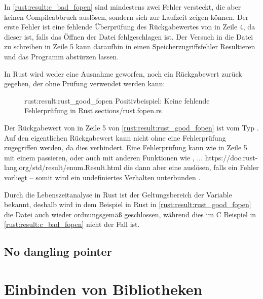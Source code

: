 In \autoref{rust:result:c_bad_fopen} sind mindestens zwei Fehler versteckt, die aber keinen Compileabbruch auslösen, sondern sich zur Laufzeit zeigen können.
Der erste Fehler ist eine fehlende Überprüfung des Rückgabewertes von  in Zeile 4, da dieser  ist, falls das Öffnen der Datei fehlgeschlagen ist.
Der Versuch in die Datei zu schreiben in Zeile 5 kann daraufhin in einen Speicherzugriffsfehler Resultieren und das Programm abstürzen lassen.

In Rust wird weder eine Ausnahme geworfen, noch ein Rückgabewert zurück gegeben, der ohne Prüfung verwendet werden kann:

\begin{figure}[H]
	\rustcinclude
		{rust:result:rust_good_fopen}
		{Positivbeispiel: Keine fehlende Fehlerprüfung in Rust}
		{sections/rust.fopen.rs}
\end{figure}

Der Rückgabewert von  in Zeile 5 von \autoref{rust:result:rust_good_fopen} ist vom Typ .
Auf den eigentlichen Rückgabewert  kann nicht ohne eine Fehlerprüfung zugegriffen werden, da dies  verhindert.
Eine Fehlerprüfung kann wie in Zeile 5 mit einem  passieren, oder auch mit anderen Funktionen wie ,  ... https://doc.rust-lang.org/std/result/enum.Result.html die dann aber eine   auslösen, falls ein Fehler vorliegt -- somit wird ein undefiniertes Verhalten unterbunden .

Durch die Lebenszeitanalyse  in Rust ist der Geltungsbereich der  Variable bekannt, deshalb wird in dem Beispiel in Rust in \autoref{rust:result:rust_good_fopen} die Datei auch wieder ordnungsgemäß geschlossen, während dies im C Beispiel in \autoref{rust:result:c_bad_fopen} nicht der Fall ist.


\subsection{No dangling pointer}


\section{Einbinden von Bibliotheken}

